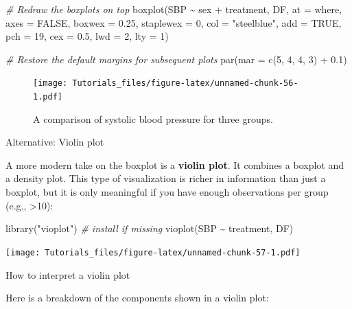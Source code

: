 \documentclass[
]{book}
\newenvironment{Shaded}{\begin{snugshade}}{\end{snugshade}}
\newcommand{\AttributeTok}[1]{\textcolor[rgb]{0.77,0.63,0.00}{#1}}
\newcommand{\CommentTok}[1]{\textcolor[rgb]{0.56,0.35,0.01}{\textit{#1}}}
\newcommand{\ConstantTok}[1]{\textcolor[rgb]{0.00,0.00,0.00}{#1}}
\newcommand{\DecValTok}[1]{\textcolor[rgb]{0.00,0.00,0.81}{#1}}
\newcommand{\FloatTok}[1]{\textcolor[rgb]{0.00,0.00,0.81}{#1}}
\newcommand{\FunctionTok}[1]{\textcolor[rgb]{0.00,0.00,0.00}{#1}}
\newcommand{\NormalTok}[1]{#1}
\newcommand{\SpecialCharTok}[1]{\textcolor[rgb]{0.00,0.00,0.00}{#1}}
\newcommand{\StringTok}[1]{\textcolor[rgb]{0.31,0.60,0.02}{#1}}
\begin{document}
\begin{Shaded}
\begin{Highlighting}[]
\CommentTok{\# Redraw the boxplots on top}
\FunctionTok{boxplot}\NormalTok{(SBP }\SpecialCharTok{\textasciitilde{}}\NormalTok{ sex }\SpecialCharTok{+}\NormalTok{ treatment, DF, }\AttributeTok{at =}\NormalTok{ where, }\AttributeTok{axes =} \ConstantTok{FALSE}\NormalTok{,}
        \AttributeTok{boxwex =} \FloatTok{0.25}\NormalTok{, }\AttributeTok{staplewex =} \DecValTok{0}\NormalTok{, }\AttributeTok{col =} \StringTok{"steelblue"}\NormalTok{, }\AttributeTok{add =} \ConstantTok{TRUE}\NormalTok{, }
        \AttributeTok{pch =} \DecValTok{19}\NormalTok{, }\AttributeTok{cex =} \FloatTok{0.5}\NormalTok{, }\AttributeTok{lwd =} \DecValTok{2}\NormalTok{, }\AttributeTok{lty =} \DecValTok{1}\NormalTok{)}

\CommentTok{\# Restore the default margins for subsequent plots}
\FunctionTok{par}\NormalTok{(}\AttributeTok{mar =} \FunctionTok{c}\NormalTok{(}\DecValTok{5}\NormalTok{, }\DecValTok{4}\NormalTok{, }\DecValTok{4}\NormalTok{, }\DecValTok{3}\NormalTok{) }\SpecialCharTok{+} \FloatTok{0.1}\NormalTok{)}
\end{Highlighting}
\end{Shaded}

\begin{figure}
\centering
\texttt{[image: Tutorials\_files/figure-latex/unnamed-chunk-56-1.pdf]}
\caption{\label{fig:unnamed-chunk-56}A comparison of systolic blood pressure for three groups.}
\end{figure}

Alternative: Violin plot

A more modern take on the boxplot is a \textbf{violin plot}. It combines a boxplot and a density plot. This type of visualization is richer in information than just a boxplot, but it is only meaningful if you have enough observations per group (e.g., \textgreater10):

\begin{Shaded}
\begin{Highlighting}[]
\FunctionTok{library}\NormalTok{(}\StringTok{"vioplot"}\NormalTok{) }\CommentTok{\# install if missing}
\FunctionTok{vioplot}\NormalTok{(SBP }\SpecialCharTok{\textasciitilde{}}\NormalTok{ treatment, DF)}
\end{Highlighting}
\end{Shaded}

\texttt{[image: Tutorials\_files/figure-latex/unnamed-chunk-57-1.pdf]}

How to interpret a violin plot

Here is a breakdown of the components shown in a violin plot:
\end{document}
